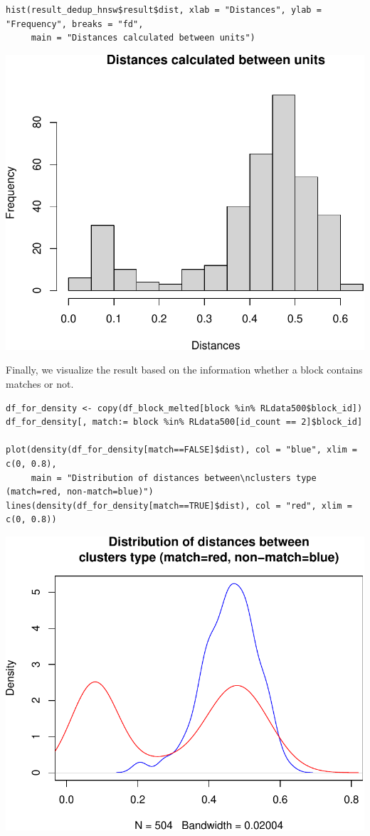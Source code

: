 \begin{verbatim}
hist(result_dedup_hnsw$result$dist, xlab = "Distances", ylab = "Frequency", breaks = "fd",
     main = "Distances calculated between units")
\end{verbatim}

\includegraphics{paper-blocking_files/figure-latex/dedup_hist-1.pdf}

Finally, we visualize the result based on the information whether a block contains matches or not.

\begin{verbatim}
df_for_density <- copy(df_block_melted[block %in% RLdata500$block_id])
df_for_density[, match:= block %in% RLdata500[id_count == 2]$block_id]

plot(density(df_for_density[match==FALSE]$dist), col = "blue", xlim = c(0, 0.8), 
     main = "Distribution of distances between\nclusters type (match=red, non-match=blue)")
lines(density(df_for_density[match==TRUE]$dist), col = "red", xlim = c(0, 0.8))
\end{verbatim}

\includegraphics{paper-blocking_files/figure-latex/dedup_density-1.pdf}

